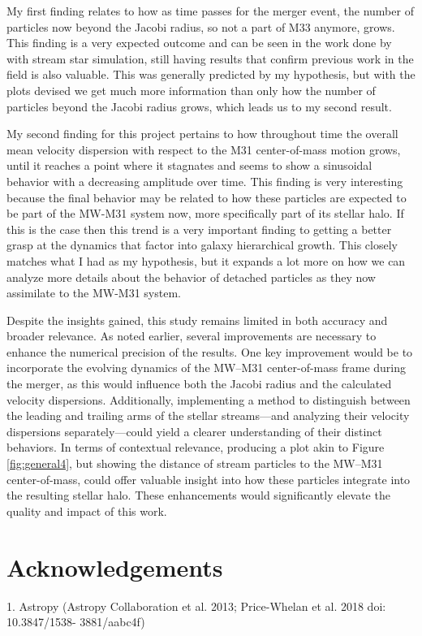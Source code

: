 \documentclass[linenumbers,trackchanges,twocolumn]{aastex7}
\begin{document}
My first finding relates to how as time passes for the merger event, the number of particles now beyond the Jacobi radius, so not a part of M33 anymore, grows. This finding is a very expected outcome and can be seen in the work done by \cite{Choi2007-lc} with stream star simulation, still having results that confirm previous work in the field is also valuable. This was generally predicted by my hypothesis, but with the plots devised we get much more information than only how the number of particles beyond the Jacobi radius grows, which leads us to my second result.

My second finding for this project pertains to how throughout time the overall mean velocity dispersion with respect to the M31 center-of-mass motion grows, until it reaches a point where it stagnates and seems to show a sinusoidal behavior with a decreasing amplitude over time. This finding is very interesting because the final behavior may be related to how these particles are expected to be part of the MW-M31 system now, more specifically part of its stellar halo. If this is the case then this trend is a very important finding to getting a better grasp at the dynamics that factor into galaxy hierarchical growth. This closely matches what I had as my hypothesis, but it expands a lot more on how we can analyze more details about the behavior of detached particles as they now assimilate to the MW-M31 system.

Despite the insights gained, this study remains limited in both accuracy and broader relevance. As noted earlier, several improvements are necessary to enhance the numerical precision of the results. One key improvement would be to incorporate the evolving dynamics of the MW–M31 center-of-mass frame during the merger, as this would influence both the Jacobi radius and the calculated velocity dispersions. Additionally, implementing a method to distinguish between the leading and trailing arms of the stellar streams—and analyzing their velocity dispersions separately—could yield a clearer understanding of their distinct behaviors. In terms of contextual relevance, producing a plot akin to Figure \ref{fig:general4}, but showing the distance of stream particles to the MW–M31 center-of-mass, could offer valuable insight into how these particles integrate into the resulting stellar halo. These enhancements would significantly elevate the quality and impact of this work.

\section{Acknowledgements}\label{sec:acknowledgements}
1. Astropy (Astropy Collaboration et al. 2013; Price-Whelan et al. 2018 doi: 10.3847/1538-
3881/aabc4f)
\end{document}
